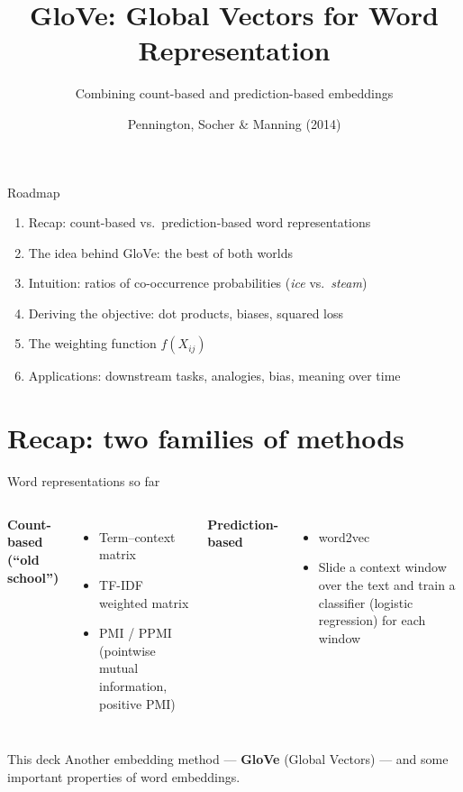 \documentclass[aspectratio=169,11pt]{beamer}
\title{GloVe: Global Vectors for Word Representation}
\subtitle{Combining count-based and prediction-based embeddings}
\author{Pennington, Socher \& Manning (2014)}
\date{}
\begin{document}
\maketitle

\begin{frame}{Roadmap}
\begin{enumerate}
  \item Recap: count-based vs.\ prediction-based word representations
  \item The idea behind GloVe: the best of both worlds
  \item Intuition: ratios of co-occurrence probabilities (\emph{ice} vs.\ \emph{steam})
  \item Deriving the objective: dot products, biases, squared loss
  \item The weighting function $f(X_{ij})$
  \item Applications: downstream tasks, analogies, bias, meaning over time
\end{enumerate}
\end{frame}

\section{Recap: two families of methods}

\begin{frame}{Word representations so far}
\begin{columns}[T]
\textbf{Count-based (``old school'')}
\begin{itemize}
  \item Term--context matrix
  \item TF-IDF weighted matrix
  \item PMI / PPMI (pointwise mutual information, positive PMI)
\end{itemize}
\textbf{Prediction-based}
\begin{itemize}
  \item word2vec
  \item Slide a context window over the text and train a classifier
        (logistic regression) for each window
\end{itemize}
\end{columns}
\vspace{4mm}
\begin{alertblock}{This deck}
Another embedding method --- \textbf{GloVe} (Global Vectors) --- and some
important properties of word embeddings.
\end{alertblock}
\end{frame}
\end{document}
